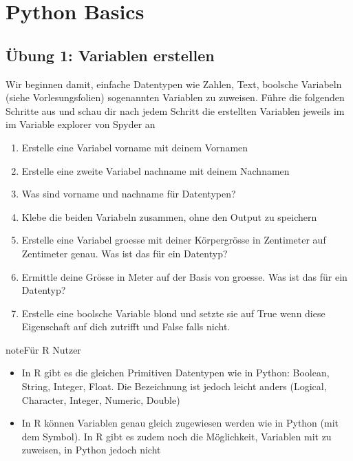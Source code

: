 \documentclass[letterpaper,10pt,english]{sphinxmanual}
\begin{document}
\chapter{Python Basics}
\label{\detokenize{01_02_Python_Basics:python-basics}}\label{\detokenize{01_02_Python_Basics::doc}}

\section{Übung 1: Variablen erstellen}
\label{\detokenize{01_02_Python_Basics:ubung-1-variablen-erstellen}}
Wir beginnen damit, einfache Datentypen wie Zahlen, Text, boolsche Variabeln (siehe Vorlesungsfolien) sogenannten Variablen zu zuweisen. Führe die folgenden Schritte aus und schau dir nach jedem Schritt die erstellten Variablen jeweils im im Variable explorer von Spyder an
\begin{enumerate}
%
\item {} 
Erstelle eine Variabel vorname mit deinem Vornamen

\item {} 
Erstelle eine zweite Variabel nachname mit deinem Nachnamen

\item {} 
Was sind vorname und nachname für Datentypen?

\item {} 
Klebe die beiden Variabeln zusammen, ohne den Output zu speichern

\item {} 
Erstelle eine Variabel groesse mit deiner Körpergrösse in Zentimeter auf Zentimeter genau. Was ist das für ein Datentyp?

\item {} 
Ermittle deine Grösse in Meter auf der Basis von groesse. Was ist das für ein Datentyp?

\item {} 
Erstelle eine boolsche Variable blond und setzte sie auf True wenn diese Eigenschaft auf dich zutrifft und False falls nicht.

\end{enumerate}

\begin{sphinxadmonition}{note}{Für R Nutzer}
\begin{itemize}
\item {} 
In R gibt es die gleichen Primitiven Datentypen wie in Python: Boolean, String, Integer, Float. Die Bezeichnung ist jedoch leicht anders (Logical, Character, Integer, Numeric, Double)

\item {} 
In R können Variablen genau gleich zugewiesen werden wie in Python (mit dem \sphinxcode{\sphinxupquote{=}} Symbol). In R gibt es zudem noch die Möglichkeit, Variablen mit \sphinxcode{\sphinxupquote{\textless{}\sphinxhyphen{}}} zu zuweisen, in Python jedoch nicht

\end{itemize}
\end{sphinxadmonition}
\end{document}
